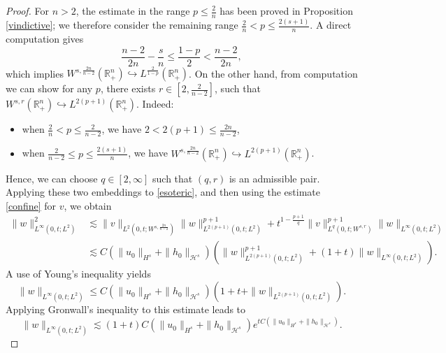 \documentclass[preprint,compress,12pt]{elsarticle}
\numberwithin{equation}{section}
\begin{document}
\begin{proof}
	For $n>2$, the estimate in the range $p\leq \frac{2}{n}$ has been proved in Proposition \ref{vindictive}; we therefore consider the remaining range $\frac{2}{n}<p\leq\frac{2(s+1)}{n}$. A direct  computation gives
	\begin{equation}
		\frac{n-2}{2n}-\frac{s}{n}\leq \frac{1-p}{2}< \frac{n-2}{2n},
	\end{equation}
	which implies $W^{s,\frac{2n}{n-2}}(\mathbb{R}^{n}_{+})\hookrightarrow L^{\frac{2}{1-p}}(\mathbb{R}^{n}_{+})$. On the other hand,  from computation we can show for any $p$, there exists $r\in [2,\frac{2}{n-2}]$, such that $W^{s,r}(\mathbb{R}^{n}_{+})\hookrightarrow L^{2(p+1)}(\mathbb{R}^{n}_{+})$. Indeed:
	\begin{itemize}
		\item  when $\frac{2}{n}<p\leq \frac{2}{n-2}$, we have $2<2(p+1)\leq \frac{2n}{n-2}$,
		\item  when $\frac{2}{n-2}\leq p\leq \frac{2(s+1)}{n}$, we have $W^{s,\frac{2n}{n-2}}(\mathbb{R}^{n}_{+})\hookrightarrow L^{2(p+1)}(\mathbb{R}^{n}_{+})$.
	\end{itemize}
	Hence, we can choose $q\in[2,\infty]$ such that $(q,r)$ is an admissible pair. Applying these two embeddings  to \eqref{esoteric}, and then using the estimate \eqref{confine} for $v$, we obtain
	\begin{equation}
		\begin{aligned}
			\|w\|_{L^{\infty}(0,t;L^{2})}^{2}&\lesssim \|v\|_{L^{2}(0,t;W^{s,\frac{2n}{n-2}})} \|w\|_{L^{2(p+1)}(0,t;L^{2})}^{p+1}+t^{1-\frac{p+1}{q}}\|v\|_{L^{q}(0,t;W^{s,r})}^{p+1} \|w\|_{L^{\infty}(0,t;L^{2})}\\&\lesssim C(\|u_{0}\|_{H^{s}}+\|h_{0}\|_{\mathcal{H}^{s}})\left(\|w\|_{L^{2(p+1)}(0,t;L^{2})}^{p+1}+(1+t) \|w\|_{L^{\infty}(0,t;L^{2})}\right).
		\end{aligned}
	\end{equation}
	A use of Young's inequality yields
	\begin{equation}
		\|w\|_{L^{\infty}(0,t;L^{2})}\leq C(\|u_{0}\|_{H^{s}}+\|h_{0}\|_{\mathcal{H}^{s}}) (1+t+\|w\|_{L^{2(p+1)}(0,t;L^{2})}).
	\end{equation}
	Applying  Gronwall's inequality to this estimate leads to
	\begin{equation}
		\|w\|_{L^{\infty}(0,t;L^{2})}\lesssim (1+t) C(\|u_{0}\|_{H^{s}}+\|h_{0}\|_{\mathcal{H}^{s}})  e^{tC(\|u_{0}\|_{H^{s}}+\|h_{0}\|_{\mathcal{H}^{s}})}.
	\end{equation}
\end{proof}
\end{document}
